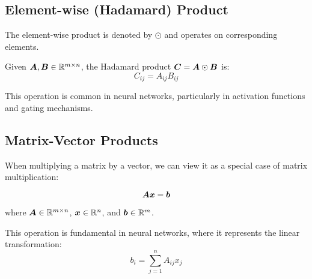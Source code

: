 \subsection{Element-wise (Hadamard) Product}

The element-wise product is denoted by $\odot$ and operates on corresponding elements.

\begin{definition}
Given $\boldsymbol{A}, \boldsymbol{B} \in \mathbb{R}^{m \times n}$, the Hadamard product $\boldsymbol{C} = \boldsymbol{A} \odot \boldsymbol{B}$ is:
\begin{equation}
    C_{ij} = A_{ij}B_{ij}
\end{equation}
\end{definition}

This operation is common in neural networks, particularly in activation functions and gating mechanisms.

\subsection{Matrix-Vector Products}

When multiplying a matrix by a vector, we can view it as a special case of matrix multiplication:

\begin{equation}
    \boldsymbol{A}\boldsymbol{x} = \boldsymbol{b}
\end{equation}

where $\boldsymbol{A} \in \mathbb{R}^{m \times n}$, $\boldsymbol{x} \in \mathbb{R}^n$, and $\boldsymbol{b} \in \mathbb{R}^m$.

This operation is fundamental in neural networks, where it represents the linear transformation:
\begin{equation}
    b_i = \sum_{j=1}^{n} A_{ij}x_j
\end{equation}


